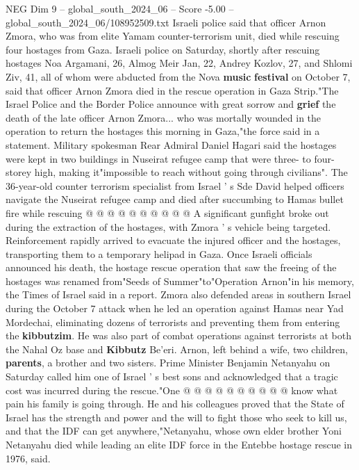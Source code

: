 \begin{textsample}{NEG Dim 9 – global\_south\_2024\_06 – Score -5.00 – global\_south\_2024\_06/108952509.txt}  \label{ex:f9_neg_354}
Israeli police said that officer Arnon Zmora, who was from elite Yamam counter-terrorism unit, died while rescuing four hostages from Gaza.
Israeli police on Saturday, shortly after rescuing hostages Noa Argamani, 26, Almog Meir Jan, 22, Andrey Kozlov, 27, and Shlomi Ziv, 41, all of whom were abducted from the Nova \textbf{music} \textbf{festival} on October 7, said that officer Arnon Zmora died in the rescue operation in Gaza Strip."The Israel Police and the Border Police announce with great sorrow and \textbf{grief} the death of the late officer Arnon Zmora... who was mortally wounded in the operation to return the hostages this morning in Gaza,"the force said in a statement.
Military spokesman Rear Admiral Daniel Hagari said the hostages were kept in two buildings in Nuseirat refugee camp that were three- to four-storey high, making it"impossible to reach without going through civilians".
The 36-year-old counter terrorism specialist from Israel ' s Sde David helped officers navigate the Nuseirat refugee camp and died after succumbing to Hamas bullet fire while rescuing @ @ @ @ @ @ @ @ @ @ A significant gunfight broke out during the extraction of the hostages, with Zmora ' s vehicle being targeted.
Reinforcement rapidly arrived to evacuate the injured officer and the hostages, transporting them to a temporary helipad in Gaza.
Once Israeli officials announced his death, the hostage rescue operation that saw the freeing of the hostages was renamed from"Seeds of Summer"to"Operation Arnon"in his memory, the Times of Israel said in a report.
Zmora also defended areas in southern Israel during the October 7 attack when he led an operation against Hamas near Yad Mordechai, eliminating dozens of terrorists and preventing them from entering the \textbf{kibbutzim}.
He was also part of combat operations against terrorists at both the Nahal Oz base and \textbf{Kibbutz} Be'eri.
Arnon, left behind a wife, two children, \textbf{parents}, a brother and two sisters.
Prime Minister Benjamin Netanyahu on Saturday called him one of Israel ' s best sons and acknowledged that a tragic cost was incurred during the rescue."One @ @ @ @ @ @ @ @ @ @ know what pain his family is going through.
He and his colleagues proved that the State of Israel has the strength and power and the will to fight those who seek to kill us, and that the IDF can get anywhere,"Netanyahu, whose own elder brother Yoni Netanyahu died while leading an elite IDF force in the Entebbe hostage rescue in 1976, said.

\end{textsample}
